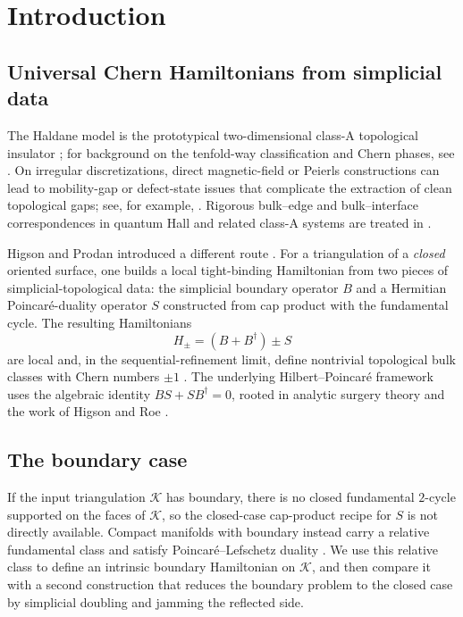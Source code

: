 \documentclass[11pt]{article}
\numberwithin{equation}{section}
\theoremstyle{definition}
\theoremstyle{remark}
\newcommand{\K}{\mathcal{K}}
\begin{document}
\section{Introduction}

\subsection{Universal Chern Hamiltonians from simplicial data}
The Haldane model is the prototypical two-dimensional class-A topological insulator
\cite{Haldane1988}; for background on the tenfold-way classification and Chern phases, see
\cite{SchnyderRyuFurusakiLudwig,KitaevPeriodic,QiZhangRMP,ProdanSchulzBaldesBook}. On irregular
discretizations, direct magnetic-field or Peierls constructions can lead to mobility-gap or
defect-state issues that complicate the extraction of clean topological gaps; see, for example,
\cite{Mitchell2018,BourneProdan2018,BourneMesland2019,ProdanSchulzBaldesBook}. Rigorous
bulk--edge and bulk--interface correspondences in quantum Hall and related class-A systems are
treated in
\cite{ElbauGraf2002,ElgartGrafSchenker2005,GrafPorta2013,BourneKellendonkRennie,KubotaControlled,EwertMeyer2019,AlldridgeMaxZirnbauer2020,LudewigThiangEdge}.

Higson and Prodan introduced a different route
\cite{HigsonProdanUniversalPRL,HigsonProdanUniversalArxiv}. For a triangulation of a \emph{closed}
oriented surface, one builds a local tight-binding Hamiltonian from two pieces of
simplicial-topological data: the simplicial boundary operator $B$ and a Hermitian Poincar\'e-duality
operator $S$ constructed from cap product with the fundamental cycle. The resulting Hamiltonians
\begin{equation}\label{eq:Hpm_intro}
H_\pm=(B+B^\dagger)\pm S
\end{equation}
are local and, in the sequential-refinement limit, define nontrivial topological bulk classes with
Chern numbers $\pm1$ \cite{HigsonProdanUniversalPRL,HigsonProdanUniversalArxiv}. The underlying
Hilbert--Poincar\'e framework uses the algebraic identity \(BS+SB^\dagger=0\), rooted in analytic
surgery theory and the work of Higson and Roe
\cite{HigsonRoeI,HigsonRoeII,HigsonRoeIII,WallSurgery}.

\subsection{The boundary case}
If the input triangulation $\K$ has boundary, there is no closed fundamental $2$-cycle supported
on the faces of $\K$, so the closed-case cap-product recipe for $S$ is not directly available.
Compact manifolds with boundary instead carry a relative fundamental class and satisfy
Poincar\'e--Lefschetz duality \cite{Hatcher}. We use this relative class to define an intrinsic
boundary Hamiltonian on $\K$, and then compare it with a second construction that reduces the
boundary problem to the closed case by simplicial doubling and jamming the reflected side.
\end{document}
